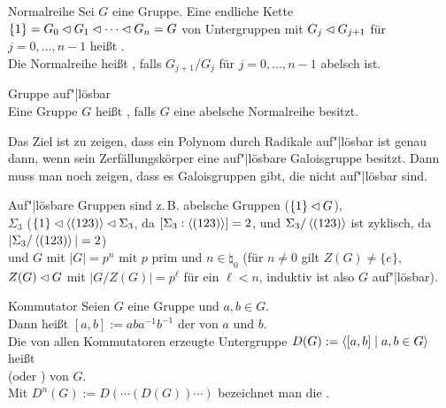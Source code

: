 \begin{Def}{Normalreihe}
    Sei $G$ eine Gruppe.
    Eine endliche Kette $\{1\} = G_0 \mathbin{\vartriangleleft} G_1 \mathbin{\vartriangleleft} \dotsb \mathbin{\vartriangleleft} G_n = G$
    von Untergruppen mit $G_j \mathbin{\vartriangleleft} G_{j+1}$ für $j = 0, \dotsc, n - 1$
    heißt .\\
    Die Normalreihe heißt , falls
    $G_{j+1}/G_j$ für $j = 0, \dotsc, n - 1$ abelsch ist.
\end{Def}

\begin{Def}{Gruppe auf"|lösbar}\\
    Eine Gruppe $G$ heißt , falls
    $G$ eine abelsche Normalreihe besitzt.
\end{Def}

\begin{Bem}
    Das Ziel ist zu zeigen, dass ein Polynom durch Radikale auf"|lösbar ist
    genau dann, wenn sein Zerfällungskörper eine auf"|lösbare Galoisgruppe
    besitzt.
    Dann muss man noch zeigen, dass es Galoisgruppen gibt, die nicht
    auf"|lösbar sind.
\end{Bem}

\begin{Bsp}
    Auf"|lösbare Gruppen sind z.\,B.
    abelsche Gruppen ($\{1\} \mathbin{\vartriangleleft} G$),\\
    $\Sigma_3$ ($\{1\} \mathbin{\vartriangleleft} \left\langle(123)\right\rangle \mathbin{\vartriangleleft} \Sigma_3$, da
    $[\Sigma_3:\left\langle(123)\right\rangle] = 2$, und
    $\Sigma_3/\left\langle(123)\right\rangle$ ist zyklisch, da
    $|\Sigma_3/\left\langle(123)\right\rangle| = 2$)\\
    und $G$ mit $|G| = p^n$ mit $p$ prim und $n \in \natural_0$
    (für $n \not= 0$ gilt $Z(G) \not= \{e\}$,
    $Z(G) \mathbin{\vartriangleleft} G$ mit $|G/Z(G)| = p^\ell$ für ein $\ell < n$,
    induktiv ist also $G$ auf"|lösbar).
\end{Bsp}

\linie

\begin{Def}{Kommutator}
    Seien $G$ eine Gruppe und $a, b \in G$.\\
    Dann heißt $[a, b] := aba^{-1}b^{-1}$ der 
    von $a$ und $b$.\\
    Die von allen Kommutatoren erzeugte Untergruppe
    $D(G) := \left\langle[a, b] \;|\; a, b \in G\right\rangle$ heißt\\
     (oder )
    von $G$.\\
    Mit $D^n(G) := D(\dotsb(D(G))\dotsb)$ bezeichnet man die
    .
\end{Def}

